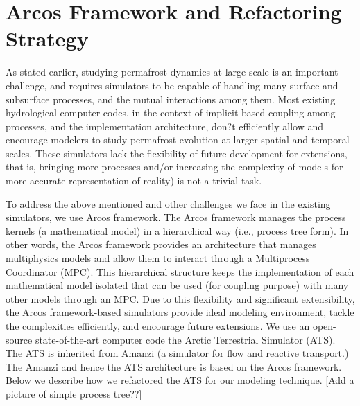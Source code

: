 \documentclass[review]{elsarticle}
\begin{document}
\section{Arcos Framework and Refactoring Strategy}
As stated earlier, studying permafrost dynamics at large-scale is an important challenge, and requires simulators to be capable of handling many surface and subsurface processes, and the mutual interactions among them. Most existing hydrological computer codes, in the context of implicit-based coupling among processes, and the implementation architecture, don?t efficiently allow and encourage modelers to study permafrost evolution at larger spatial and temporal scales. These simulators lack the flexibility of future development for extensions, that is, bringing more processes and/or increasing the complexity of models for more accurate representation of reality) is not a trivial task.

To address the above mentioned and other challenges we face in the existing simulators, we use Arcos framework. The Arcos framework manages the process kernels (a mathematical model) in a hierarchical way (i.e., process tree form). In other words, the Arcos framework provides an architecture that manages multiphysics models and allow them to interact through a Multiprocess Coordinator (MPC). This hierarchical structure keeps the implementation of each mathematical model isolated that can be used (for coupling purpose) with many other models through an MPC. Due to this flexibility and significant extensibility, the Arcos framework-based simulators provide ideal modeling environment, tackle the complexities efficiently, and encourage future extensions. 
We use an open-source state-of-the-art computer code the Arctic Terrestrial Simulator (ATS). The ATS is inherited from Amanzi (a simulator for flow and reactive transport.) The Amanzi and hence the ATS architecture is based on the Arcos framework.  Below we describe how we refactored the ATS for our modeling technique. [Add a picture of simple process tree??]
\end{document}
